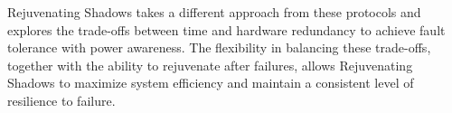 Rejuvenating Shadows takes a different approach from these protocols and explores the trade-offs between time and hardware redundancy to achieve fault tolerance with power awareness. The flexibility in balancing these trade-offs, together with the ability to rejuvenate after failures, allows Rejuvenating Shadows to maximize system efficiency and maintain a consistent level of resilience to failure.
